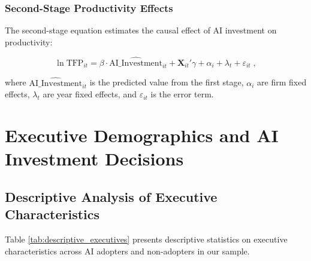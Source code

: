 \documentclass[12pt, a4paper]{article}
\begin{document}
\subsubsection{Second-Stage Productivity Effects}

The second-stage equation estimates the causal effect of AI investment on productivity:

\begin{equation}
\ln \text{TFP}_{it} = \beta \cdot \widehat{\text{AI}\_\text{Investment}}_{it} + \mathbf{X}_{it}'\gamma + \alpha_i + \lambda_t + \varepsilon_{it} \;,
\end{equation}

where $\widehat{\text{AI}\_\text{Investment}}_{it}$ is the predicted value from the first stage, $\alpha_i$ are firm fixed effects, $\lambda_t$ are year fixed effects, and $\varepsilon_{it}$ is the error term.

\section{Executive Demographics and AI Investment Decisions}

\subsection{Descriptive Analysis of Executive Characteristics}

Table \ref{tab:descriptive_executives} presents descriptive statistics on executive characteristics across AI adopters and non-adopters in our sample.
\end{document}
